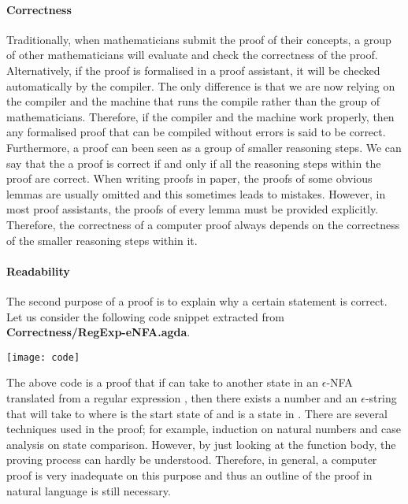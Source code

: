 \paragraph{Correctness} Traditionally, when mathematicians submit
the proof of their concepts, a group of other mathematicians will
evaluate and check the correctness of the proof. Alternatively, if the
proof is formalised in a proof assistant, it will be checked 
automatically by the compiler. The only difference is that we are now
relying on the compiler and the machine that runs the compile rather
than the group of mathematicians. Therefore, if the compiler and the
machine work properly, then any formalised proof that
can be compiled without errors is said to be correct. Furthermore, a
proof can been seen as a group of smaller reasoning steps. We can say that the a proof is correct if and only if all the
reasoning steps within the proof are correct. When writing proofs in paper, the proofs of
some obvious lemmas are usually omitted and this sometimes leads to mistakes. However, in
most proof assistants, the proofs of every lemma must be provided explicitly. Therefore, the correctness of
a computer proof always depends on the correctness of the smaller reasoning steps within it. 

\paragraph{Readability} The second purpose of a proof is to explain why
a certain statement is correct. Let us consider the following code
snippet extracted from \textbf{Correctness/RegExp-eNFA.agda}. 
\begin{center} \texttt{[image: code]} \end{center}

\par The above code is a proof that if  can take  to
another state  in an \(\epsilon\)-NFA translated from a
regular expression , then there exists a number  and
an \(\epsilon\)-string  that will take  to  where
 is the start state of  and  is a state in
. There are several techniques used in the proof; for example,
induction on natural numbers and case analysis on state comparison. However, by
just looking at the function body, the proving process can hardly be
understood. Therefore, in general, a computer proof is very inadequate on
this purpose and thus an outline of the proof in natural language is
still necessary. 

